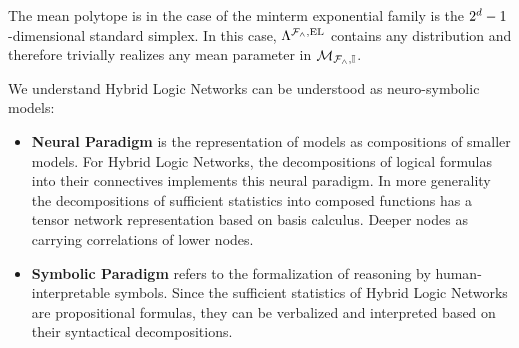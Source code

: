 \begin{example}
    The mean polytope is in the case of the minterm exponential family is the $2^d-1$-dimensional standard simplex.
    In this case, $\Lambda^{\mathcal{F}_{\land},\mathrm{EL}}$ contains any distribution and therefore trivially realizes any mean parameter in $\mathcal{M}_{\mathcal{F}_{\land},\mathbb{I}}$.
\end{example}



We understand Hybrid Logic Networks can be understood as neuro-symbolic models:
\begin{itemize}
    \item \textbf{Neural Paradigm} is the representation of models as compositions of smaller models.
    For Hybrid Logic Networks, the decompositions of logical formulas into their connectives implements this neural paradigm.
    In more generality the decompositions of sufficient statistics into composed functions has a tensor network representation based on basis calculus.
    Deeper nodes as carrying correlations of lower nodes.
    \item \textbf{Symbolic Paradigm} refers to the formalization of reasoning by human-interpretable symbols.
    Since the sufficient statistics of Hybrid Logic Networks are propositional formulas, they can be verbalized and interpreted based on their syntactical decompositions.
\end{itemize}

